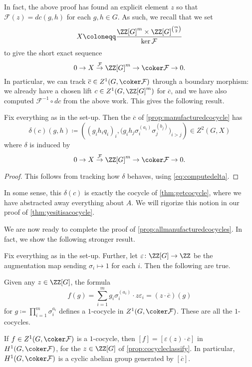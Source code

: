 \documentclass{article}
\numberwithin{equation}{section}
\begin{document}
In fact, the above proof has found an explicit element $z$ so that $\mathcal F(z)=dc(g,h)$ for each $g,h\in G$. As such, we recall that we set
\[X\coloneqq\frac{\ZZ[G]^m\times\ZZ[G]^{\binom m2}}{\ker\mathcal F}\]
to give the short exact sequence
\[0\to X\stackrel{\mathcal F}\to\ZZ[G]^m\to\coker\mathcal F\to0.\]
In particular, we can track $\overline c\in Z^1(G,\coker\mathcal F)$ through a boundary morphism: we already have a chosen lift $c\in Z^1(G,\ZZ[G]^m)$ for $\overline c$, and we have also computed $\mathcal F^{-1}\circ dc$ from the above work. This gives the following result.
\begin{cor} \label{cor:deltaccomputation}
	Fix everything as in the set-up. Then the $\overline c$ of \autoref{prop:manufacturedcocycle} has
	\[\delta(c)(g,h)\coloneqq\left((g_ih_iq_i)_i,\big(g_ih_j\sigma_i^{(a_i)}\sigma_j^{(b_j)}\big)_{i>j}\right)\in Z^2(G,X)\]
	where $\delta$ is induced by
	\[0\to X\stackrel{\mathcal F}\to\ZZ[G]^m\to\coker\mathcal F\to0.\]
\end{cor}
\begin{proof}
	This follows from tracking how $\delta$ behaves, using \autoref{eq:computedelta}.
\end{proof}
\begin{remark}
	In some sense, this $\delta(c)$ is exactly the cocycle of \autoref{thm:getcocycle}, where we have abstracted away everything about $A$. We will rigorize this notion in our proof of \autoref{thm:yesitisacocycle}.
\end{remark}
We are now ready to complete the proof of \autoref{prop:allmanufacturedcocycles}. In fact, we show the following stronger result.
\begin{proposition} \label{prop:computeh1cokerF}
	Fix everything as in the set-up. Further, let $\varepsilon\colon\ZZ[G]\to\ZZ$ be the augmentation map sending $\sigma_i\mapsto1$ for each $i$. Then the following are true.
	\begin{listalph}
		\item Given any $z\in\ZZ[G]$, the formula
		\[f(g)=\sum_{i=1}^mg_i\sigma_i^{(a_i)}\cdot z\varepsilon_i=(z\cdot\overline c)(g)\]
		for $g\coloneqq\prod_{i=1}^m\sigma_i^{a_i}$ defines a $1$-cocycle in $Z^1(G,\coker\mathcal F)$. These are all the $1$-cocycles.
		\item If $f\in Z^1(G,\coker\mathcal F)$ is a $1$-cocycle, then $[f]=[\varepsilon(z)\cdot\overline c]$ in $H^1(G,\coker\mathcal F)$, for the $z\in\ZZ[G]$ of \autoref{prop:cocycleclassify}. In particular, $H^1(G,\coker\mathcal F)$ is a cyclic abelian group generated by $[\overline c]$.
	\end{listalph}
\end{proposition}
\end{document}
